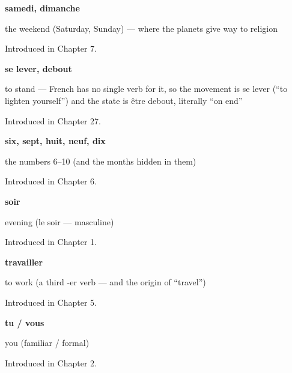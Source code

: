 \noindent\begin{minipage}[t]{\linewidth}
\raggedright
\textbf{samedi, dimanche}\par
\small the weekend (Saturday, Sunday) — where the planets give way to religion\par
\footnotesize Introduced in Chapter 7.
\end{minipage}\par\medskip

\noindent\begin{minipage}[t]{\linewidth}
\raggedright
\textbf{se lever, debout}\par
\small to stand — French has no single verb for it, so the movement is se lever (\textquotedblleft{}to lighten yourself\textquotedblright{}) and the state is être debout, literally \textquotedblleft{}on end\textquotedblright{}\par
\footnotesize Introduced in Chapter 27.
\end{minipage}\par\medskip

\noindent\begin{minipage}[t]{\linewidth}
\raggedright
\textbf{six, sept, huit, neuf, dix}\par
\small the numbers 6–10 (and the months hidden in them)\par
\footnotesize Introduced in Chapter 6.
\end{minipage}\par\medskip

\noindent\begin{minipage}[t]{\linewidth}
\raggedright
\textbf{soir}\par
\small evening (le soir — masculine)\par
\footnotesize Introduced in Chapter 1.
\end{minipage}\par\medskip

\noindent\begin{minipage}[t]{\linewidth}
\raggedright
\textbf{travailler}\par
\small to work (a third -er verb — and the origin of \textquotedblleft{}travel\textquotedblright{})\par
\footnotesize Introduced in Chapter 5.
\end{minipage}\par\medskip

\noindent\begin{minipage}[t]{\linewidth}
\raggedright
\textbf{tu / vous}\par
\small you (familiar / formal)\par
\footnotesize Introduced in Chapter 2.
\end{minipage}\par\medskip

